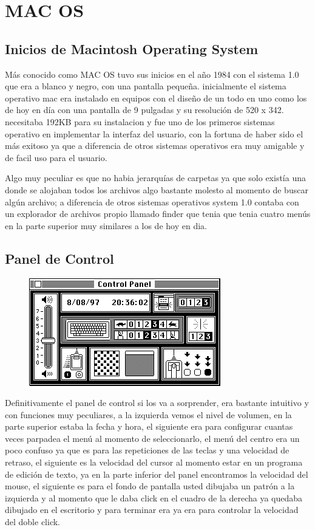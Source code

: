 \chapter*{MAC OS}

\section*{Inicios de Macintosh Operating System}
Más conocido como MAC OS tuvo sus inicios en el año 1984 con el sistema 1.0 que era a blanco y negro, con una pantalla pequeña. inicialmente el sistema operativo mac era instalado en equipos con el diseño de un todo en uno como los de hoy en día con una pantalla de 9 pulgadas y su resolución de 520 x 342. necesitaba 192KB para su instalacion y fue uno de los primeros sistemas operativo en implementar la interfaz del usuario, con la fortuna de haber sido el más exitoso ya que a diferencia de otros sistemas operativos era muy amigable y de facil uso para el usuario.

Algo muy peculiar es que no habia jerarquías de carpetas ya que solo existía una donde se alojaban todos los archivos algo bastante molesto al momento de buscar algún archivo; a diferencia de otros sistemas operativos system 1.0 contaba con un explorador de archivos propio llamado finder que tenia que tenia cuatro menús en la parte superior muy similares a los de hoy en dia.

\section*{Panel de Control}
\begin{figure}
	\includegraphics[scale=1]{img/cp09/img0901.png} 
\end{figure}
Definitivamente el panel de control si los va a sorprender, era bastante intuitivo y con funciones muy peculiares, a la izquierda vemos el nivel de volumen, en la parte superior estaba la fecha y hora, el siguiente era para configurar cuantas veces parpadea el menú al momento de seleccionarlo, el menú del centro era un poco confuso ya que es para las repeticiones de las teclas y una velocidad de retraso, el siguiente es la velocidad del cursor al momento estar en un programa de edición de texto, ya en la parte inferior del panel encontramos la velocidad del mouse, el siguiente es para el fondo de pantalla usted dibujaba un patrón a la izquierda y al momento que le daba click en el cuadro de la derecha ya quedaba dibujado en el escritorio y para terminar era ya era para controlar la velocidad del doble click.

